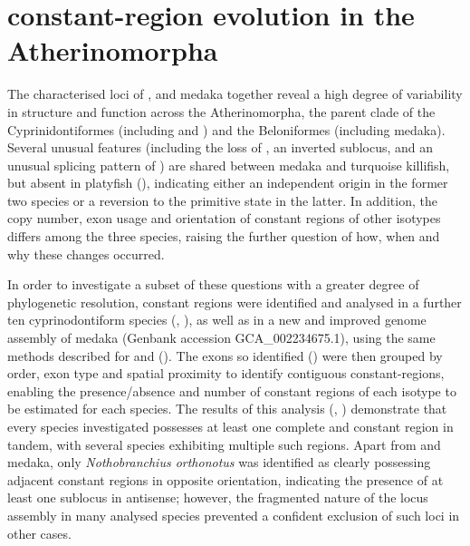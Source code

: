 
\section{\igh{} constant-region evolution in the Atherinomorpha}
\label{sec:locus_comparative}

The characterised \igh{} loci of \nfu, \xma and medaka together reveal a high degree of variability in structure and function across the Atherinomorpha, the parent clade of the Cyprinidontiformes (including \Nfu and \Xma) and the Beloniformes (including medaka). Several unusual features (including the loss of , an inverted sublocus, and an unusual splicing pattern of ) are shared between medaka and turquoise killifish, but absent in platyfish (), indicating either an independent origin in the former two species or a reversion to the primitive state in the latter. In addition, the copy number, exon usage and orientation of constant regions of other isotypes differs among the three species, raising the further question of how, when and why these changes occurred. 

In order to investigate a subset of these questions with a greater degree of phylogenetic resolution, \igh{} constant regions were identified and analysed in a further ten cyprinodontiform species (, ), as well as in a new and improved genome assembly of medaka (Genbank accession GCA\_002234675.1), using the same methods described for \Nfu and \Xma (). The exons so identified () were then grouped by order, exon type and spatial proximity to identify contiguous constant-regions, enabling the presence/absence and number of constant regions of each isotype to be estimated for each species. %
The results of this analysis (, ) demonstrate that every species investigated possesses at least one complete  and  constant region in tandem, with several species exhibiting multiple such regions. Apart from \Nfu and medaka, only \textit{Nothobranchius orthonotus} was identified as clearly possessing adjacent constant regions in opposite orientation, indicating the presence of at least one sublocus in antisense; however, the fragmented nature of the \igh{} locus assembly in many analysed species prevented a confident exclusion of such loci in other cases.

